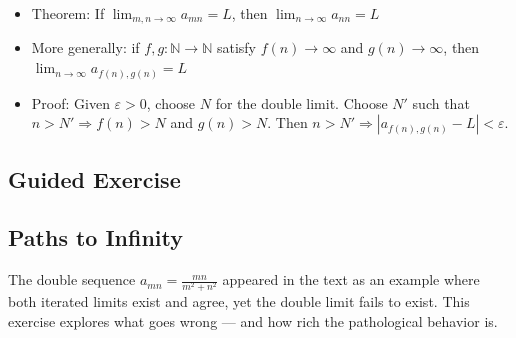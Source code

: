 \documentclass[
  10pt,
  letterpaper,
]{scrbook}
\providecommand{\tightlist}{%
  \setlength{\itemsep}{0pt}\setlength{\parskip}{0pt}}
\begin{document}
\begin{itemize}
  \begin{itemize}
  \tightlist
  \item
    \(\lim_m \lim_n a_{mn} = \lim_m 0 = 0\)
  \item
    \(\lim_n \lim_m a_{mn} = \lim_n 0 = 0\)
  \item
    Iterated limits agree! Both are \(0\).
  \item
    But along diagonal \(m = n\): \(\frac{n^2}{2n^2} = \frac{1}{2}\)
  \item
    So the double limit cannot exist (diagonal gives different value)
  \end{itemize}
\item
  Theorem: If \(\lim_{m,n \to \infty} a_{mn} = L\), then
  \(\lim_{n \to \infty} a_{nn} = L\)
\item
  More generally: if \(f, g: \mathbb{N} \to \mathbb{N}\) satisfy
  \(f(n) \to \infty\) and \(g(n) \to \infty\), then
  \(\lim_{n \to \infty} a_{f(n), g(n)} = L\)
\item
  Proof: Given \(\varepsilon > 0\), choose \(N\) for the double limit.
  Choose \(N'\) such that \(n > N' \Rightarrow f(n) > N\) and
  \(g(n) > N\). Then
  \(n > N' \Rightarrow |a_{f(n), g(n)} - L| < \varepsilon\).
\end{itemize}

\subsection{Guided Exercise}\label{guided-exercise-8}

\subsection{Paths to Infinity}\label{paths-to-infinity}

The double sequence \(a_{mn} = \frac{mn}{m^2 + n^2}\) appeared in the
text as an example where both iterated limits exist and agree, yet the
double limit fails to exist. This exercise explores what goes wrong ---
and how rich the pathological behavior is.
\end{document}
